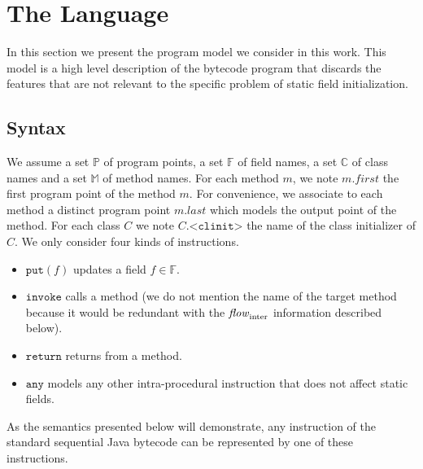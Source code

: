 \documentclass{entcs}
\newcommand{\clinit}{\ensuremath{\texttt{<clinit>}}}
\newcommand{\flow}{\mathit{flow}}
\newcommand{\interflow}{\flow_{\rm inter}}
\begin{document}
\section{The Language}
\label{sec:language}
In this section we present the program model we consider in this work.
This model is a high level description of the bytecode program that
discards the features that are not relevant to the specific problem of
static field initialization.


\subsection{Syntax}
\label{sec:syntax}

\newcommand{\ppt}{\mathbb{P}}
\newcommand{\first}{\mathit{first}}
\newcommand{\last}{\mathit{last}}
\newcommand{\fields}{\mathbb{F}}
\newcommand{\class}{\mathbb{C}}
\newcommand{\method}{\mathbb{M}}
\newcommand{\instrAt}{\mathit{instr}}
\newcommand{\any}{\mathtt{any}}
\newcommand{\getS}{\mathtt{getstatic}}
\newcommand{\putS}{\mathtt{put}}
\newcommand{\invoke}{\mathtt{invoke}}
\newcommand{\return}{\mathtt{return}}
\newcommand{\pto}{\rightharpoonup}

We assume a set $\ppt$ of program points, a set $\fields$ of field
names, a set $\class$ of class names and a set $\method$ of method
names.  For each method $m$, we note $m.\first$ the first program point
of the method $m$.  For convenience, we associate to each method a
distinct program point $m.\last$ which models the output point of the
method.  For each class $C$ we note $C.\clinit$ the name of the class
initializer of $C$.  We only consider four kinds of instructions.
\begin{itemize}
\item $\putS(f)$ updates a field $f\in\fields$.
\item $\invoke$ calls a method (we do not mention the name of the
  target method because it would be redundant with the $\interflow$
  information described below).
\item $\return$ returns from a method.
\item $\any$ models any other intra-procedural instruction that does
  not affect static fields.
\end{itemize}
As the semantics presented below will demonstrate, any instruction of
the standard sequential Java bytecode can be represented by one of
these instructions.
\end{document}
